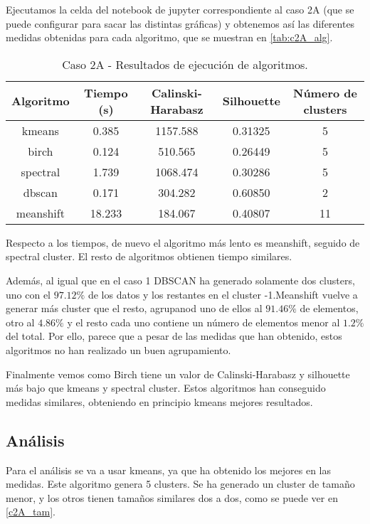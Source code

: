 Ejecutamos la celda del notebook de jupyter correspondiente al caso 2A (que se puede configurar para sacar las distintas gráficas) y obtenemos así las diferentes medidas obtenidas para cada algoritmo, que se muestran en \eqref{tab:c2A_alg}.

\begin{table}[H]
\centering
\caption{Caso 2A - Resultados de ejecución de algoritmos.}
\label{tab:c2_alg}
\begin{tabular}{ccccc}
\toprule
 Algoritmo & Tiempo (s) & Calinski-Harabasz & Silhouette & Número de clusters \\
\midrule
kmeans & 0.385 & 1157.588 & 0.31325 & 5 \\
birch & 0.124 & 510.565 & 0.26449 & 5 \\
spectral & 1.739 & 1068.474 & 0.30286 & 5 \\
dbscan & 0.171 & 304.282 & 0.60850 & 2 \\
meanshift & 18.233 & 184.067 & 0.40807 & 11 \\
\bottomrule
\end{tabular}
\end{table}

Respecto a los tiempos, de nuevo el algoritmo más lento es meanshift, seguido de spectral cluster. El resto de algoritmos obtienen tiempo similares.

Además, al igual que en el caso 1 DBSCAN ha generado solamente dos clusters, uno con el $97.12\%$ de los datos y los restantes en el cluster -1.Meanshift vuelve a generar más cluster que el resto, agrupanod uno de ellos al $91.46\%$ de elementos, otro al $4.86\%$ y el resto cada uno contiene un número de elementos menor al $1.2\%$ del total. Por ello, parece que a pesar de las medidas que han obtenido, estos algoritmos no han realizado un buen agrupamiento.

Finalmente vemos como Birch tiene un valor de Calinski-Harabasz y silhouette más bajo que kmeans y spectral cluster. Estos algoritmos han conseguido medidas similares, obteniendo en principio kmeans mejores resultados.


\subsection{Análisis}


Para el análisis se va a usar kmeans, ya que ha obtenido los mejores en las medidas. Este algoritmo genera 5 clusters. Se ha generado un cluster de tamaño menor, y los otros tienen tamaños similares dos a dos, como se puede ver en \eqref{c2A_tam}.

